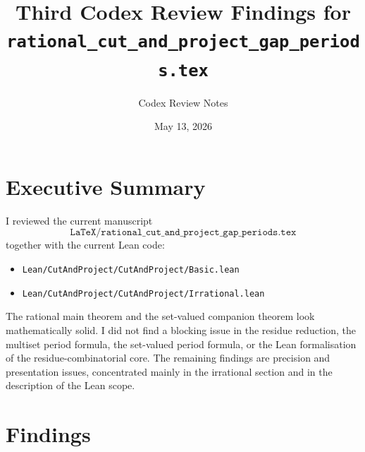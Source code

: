 \documentclass[11pt]{article}
\title{Third Codex Review Findings for\\
\texttt{rational\_cut\_and\_project\_gap\_periods.tex}}
\author{Codex Review Notes}
\date{May 13, 2026}
\begin{document}
\maketitle

\section*{Executive Summary}

I reviewed the current manuscript
\[
\texttt{LaTeX/rational\_cut\_and\_project\_gap\_periods.tex}
\]
together with the current Lean code:
\begin{itemize}[leftmargin=*]
  \item \texttt{Lean/CutAndProject/CutAndProject/Basic.lean}
  \item \texttt{Lean/CutAndProject/CutAndProject/Irrational.lean}
\end{itemize}

The rational main theorem and the set-valued companion theorem look
mathematically solid.  I did not find a blocking issue in the residue
reduction, the multiset period formula, the set-valued period formula, or the
Lean formalisation of the residue-combinatorial core.  The remaining findings
are precision and presentation issues, concentrated mainly in the irrational
section and in the description of the Lean scope.

\section*{Findings}
\end{document}
